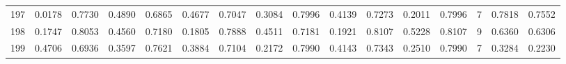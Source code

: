 \begin{tabular}{lrrrrrrrrrrrrrrr}
197 &      0.0178 &  0.7730 &  0.4890 &  0.6865 &  0.4677 &  0.7047 &  0.3084 &  0.7996 &  0.4139 &  0.7273 &   0.2011 &     0.7996 &      7 &                    0.7818 &                     0.7552 \\
198 &      0.1747 &  0.8053 &  0.4560 &  0.7180 &  0.1805 &  0.7888 &  0.4511 &  0.7181 &  0.1921 &  0.8107 &   0.5228 &     0.8107 &      9 &                    0.6360 &                     0.6306 \\
199 &      0.4706 &  0.6936 &  0.3597 &  0.7621 &  0.3884 &  0.7104 &  0.2172 &  0.7990 &  0.4143 &  0.7343 &   0.2510 &     0.7990 &      7 &                    0.3284 &                     0.2230 \\
\bottomrule
\end{tabular}

